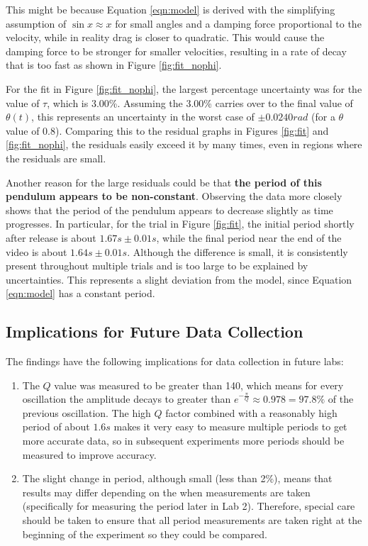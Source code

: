 \documentclass[aps,twocolumn,secnumarabic,nobalancelastpage,amsmath,amssymb,nofootinbib,letterpaper]{revtex4}
\begin{document}
This might be because Equation \ref{eqn:model} is derived with the simplifying assumption of \(\sin x \approx x\) for
small angles and a damping force proportional to the velocity, while in reality drag is closer to quadratic.
This would cause the damping force to be stronger for smaller velocities, resulting in a rate of decay that is too fast
as shown in Figure \ref{fig:fit_nophi}.

For the fit in Figure \ref{fig:fit_nophi}, the largest percentage uncertainty was for the value of \(\tau\), which is
3.00\%. Assuming the 3.00\% carries over to the final value of \(\theta(t)\), this represents an uncertainty in the
worst case of \(\pm 0.0240\si{rad}\) (for a \(\theta\) value of 0.8). Comparing this to the residual graphs in Figures
\ref{fig:fit} and \ref{fig:fit_nophi}, the residuals easily exceed it by many times, even in regions where the
residuals are small.

Another reason for the large residuals could be that \textbf{the period of this pendulum appears to be non-constant}.
Observing the data more closely shows that the period of the pendulum appears to decrease slightly as time progresses.
In particular, for the trial in Figure \ref{fig:fit}, the initial period shortly after release is about
\(1.67\si{s} \pm 0.01\si{s}\), while the final period near the end of the video is about \(1.64\si{s} \pm 0.01\si{s}\).
Although the difference is small, it is consistently present throughout multiple trials and is too large to be explained
by uncertainties. This represents a slight deviation from the model, since Equation \ref{eqn:model} has a constant
period.

\subsection{Implications for Future Data Collection}

The findings have the following implications for data collection in future labs:
\begin{enumerate}
    \item The \(Q\) value was measured to be greater than 140, which means for every oscillation the amplitude decays to
          greater than \(e^{-\frac{\pi}{Q}} \approx 0.978 = 97.8\%\) of the previous oscillation. The high \(Q\) factor
          combined with a reasonably high period of about \(1.6\si{s}\) makes it very easy to measure multiple periods
          to get more accurate data, so in subsequent experiments more periods should be measured to improve accuracy.
    \item The slight change in period, although small (less than 2\%), means that results may differ depending on the
          when measurements are taken (specifically for measuring the period later in Lab 2). Therefore, special care
          should be taken to ensure that all period measurements are taken right at the beginning of the experiment so
          they could be compared.
\end{enumerate}
\end{document}
